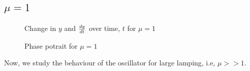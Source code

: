 \documentclass{article}
\begin{document}
\subsection{$\mu=1$}
\begin{figure}[H]
\centering 
\noindent{}%
\caption{Change in $y$ and $dy \over dt$  over time, $t$ for $\mu=1$}
\end{figure}
\begin{figure}[H]
\centering 
\noindent{}%
\caption{Phase potrait for $\mu=1$}
\end{figure}
Now, we study the behaviour of the oscillator for large lamping, i.e, $\mu>>1$.\\
\end{document}
